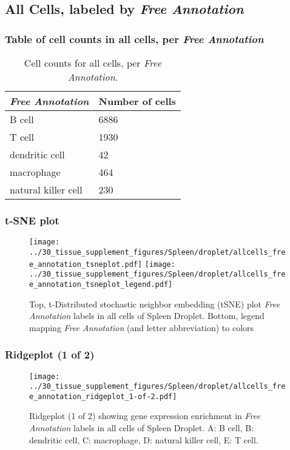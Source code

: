 \clearpage

\subsection{All Cells, labeled by \emph{Free Annotation}}
\subsubsection{Table of cell counts in all cells, per \emph{Free Annotation}}\begin{table}[h]
\centering
\label{my-label}
\begin{tabular}{@{}ll@{}}
\toprule

\emph{Free Annotation}& Number of cells \\ \midrule
B cell & 6886 \\

T cell & 1930 \\

dendritic cell & 42 \\

macrophage & 464 \\

natural killer cell & 230 \\
\bottomrule
\end{tabular}
\caption{Cell counts for all cells, per \emph{Free Annotation}.}
\end{table}

\clearpage
\subsubsection{t-SNE plot}
\begin{figure}[h]
\centering
\texttt{[image: ../30\_tissue\_supplement\_figures/Spleen/droplet/allcells\_free\_annotation\_tsneplot.pdf]}
\texttt{[image: ../30\_tissue\_supplement\_figures/Spleen/droplet/allcells\_free\_annotation\_tsneplot\_legend.pdf]}
\caption{Top, t-Distributed stochastic neighbor embedding (tSNE) plot  \emph{Free Annotation} labels in all cells of Spleen Droplet. Bottom, legend mapping \emph{Free Annotation} (and letter abbreviation) to colors}
\end{figure}


\clearpage

\subsubsection{Ridgeplot (1 of 2)}
\begin{figure}[h]
\centering
\texttt{[image: ../30\_tissue\_supplement\_figures/Spleen/droplet/allcells\_free\_annotation\_ridgeplot\_1-of-2.pdf]}

\caption{ Ridgeplot (1 of 2)  showing gene expression enrichment in \emph{Free Annotation} labels in all cells of Spleen Droplet. A: B cell, B: dendritic cell, C: macrophage, D: natural killer cell, E: T cell.}
\end{figure}


